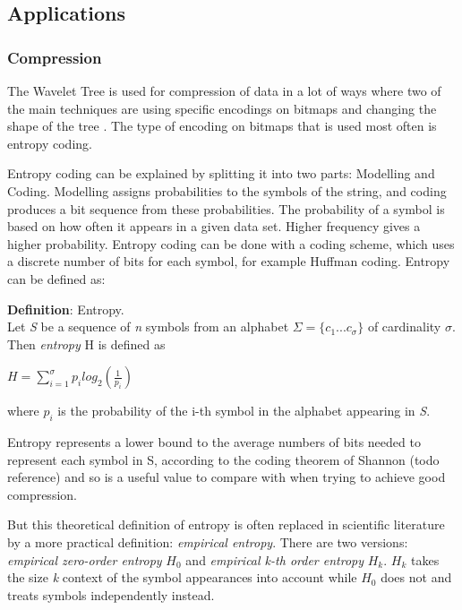 \subsection{Applications}
\subsubsection{Compression}
The Wavelet Tree is used for compression of data in a lot of ways where two of the main techniques are using specific encodings on bitmaps and changing the shape of the tree \citep[Section~3]{Navjda13}.
The type of encoding on bitmaps that is used most often is entropy coding.

Entropy coding can be explained by splitting it into two parts: Modelling and Coding.
Modelling assigns probabilities to the symbols of the string, and coding produces a bit sequence from these probabilities.
The probability of a symbol is based on how often it appears in a given data set. 
Higher frequency gives a higher probability.
Entropy coding can be done with a coding scheme, which uses a discrete number of bits for each symbol, for example Huffman coding. 
Entropy can be defined as:

\begin{mdframed}[nobreak, linecolor=lightgray]
\textbf{Definition}: Entropy. \\
Let \textit{S} be a sequence of \textit{n} symbols from an alphabet $\Sigma = \lbrace c_1 ... c_\sigma \rbrace$ of cardinality $\sigma$.
Then \textit{entropy} H is defined as
\begin{center}
$H = \sum_{i=1}^{\sigma} p_i log_2(\frac{1}{p_i})$
\end{center}
where $p_i$ is the probability of the i-th symbol in the alphabet appearing in \textit{S}. 
\end{mdframed}

Entropy represents a lower bound to the average numbers of bits needed to represent each symbol in S, according to the coding theorem of Shannon (todo reference) and so is a useful value to compare with when trying to achieve good compression.

But this theoretical definition of entropy is often replaced in scientific literature by a more practical definition: \textit{empirical entropy}.
There are two versions: \textit{empirical zero-order entropy} $H_0$ and \textit{empirical k-th order entropy} $H_k$. $H_k$ takes the size \textit{k} context of the symbol appearances into account while $H_0$ does not and treats symbols independently instead. 

